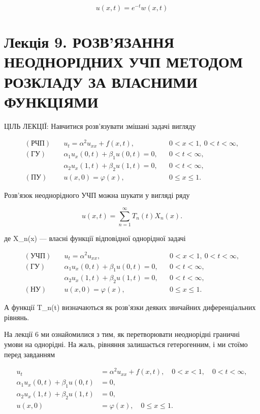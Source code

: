 \documentclass[
  ukrainian,
]{article}
\begin{document}
\[
u(x,t) = e^{-t}w(x,t)
\]

\section{Лекція 9. РОЗВ'ЯЗАННЯ НЕОДНОРІДНИХ УЧП МЕТОДОМ РОЗКЛАДУ ЗА
ВЛАСНИМИ
ФУНКЦІЯМИ}\label{ux43bux435ux43aux446ux456ux44f-9.-ux440ux43eux437ux432ux44fux437ux430ux43dux43dux44f-ux43dux435ux43eux434ux43dux43eux440ux456ux434ux43dux438ux445-ux443ux447ux43f-ux43cux435ux442ux43eux434ux43eux43c-ux440ux43eux437ux43aux43bux430ux434ux443-ux437ux430-ux432ux43bux430ux441ux43dux438ux43cux438-ux444ux443ux43dux43aux446ux456ux44fux43cux438}

ЦІЛЬ ЛЕКЦІЇ: Навчитися розв'язувати змішані задачі вигляду

\[
\begin{aligned}
(\text{РЧП})\quad & u_t = \alpha^2 u_{xx} + f(x,t), && 0 < x < 1,\ 0 < t < \infty, \\
(\text{ГУ})\quad & \alpha_1 u_x(0,t) + \beta_1 u(0,t) = 0, && 0 < t < \infty, \\
& \alpha_2 u_x(1,t) + \beta_2 u(1,t) = 0, && 0 < t < \infty, \\
(\text{ПУ})\quad & u(x,0) = \varphi(x), && 0 \leqslant x \leqslant 1.
\end{aligned}
\]

Розв'язок неоднорідного УЧП можна шукати у вигляді ряду

\[
u(x,t) = \sum_{n=1}^{\infty} T_n(t) X_n(x).
\]

де X\_n(x) --- власні функції відповідної однорідної задачі

\[
\begin{aligned}
(\text{УЧП})\quad & u_t = \alpha^2 u_{xx}, && 0 < x < 1,\ 0 < t < \infty, \\
(\text{ГУ})\quad & \alpha_1 u_x(0,t) + \beta_1 u(0,t) = 0, && 0 < t < \infty, \\
& \alpha_2 u_x(1,t) + \beta_2 u(1,t) = 0, && 0 < t < \infty, \\
(\text{НУ})\quad & u(x,0) = \varphi(x), && 0 \leqslant x \leqslant 1.
\end{aligned}
\]

А функції T\_n(t) визначаються як розв'язки деяких звичайних
диференціальних рівнянь.

На лекції 6 ми ознайомилися з тим, як перетворювати неоднорідні граничні
умови на однорідні. На жаль, рівняння залишається гетерогенним, і ми
стоїмо перед завданням

\[
\begin{aligned}
u_{t} &= \alpha^{2} u_{xx} + f(x, t), \quad 0 < x < 1, \quad 0 < t < \infty,\\
\alpha_{1} u_{x}(0, t) + \beta_{1} u(0, t) &= 0, \\
\alpha_{2} u_{x}(1, t) + \beta_{2} u(1, t) &= 0, \\
u(x, 0) &= \varphi(x), \quad 0 \le x \le 1.
\end{aligned}
\]
\end{document}
